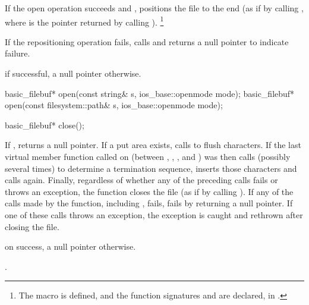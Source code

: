 \begin{itemdescr}
\pnum
If the open operation succeeds and
,
positions the file to the end
(as if by calling , where
 is the pointer returned by calling ).%
\footnote{The macro 
is defined, and the function signatures
%
and
%
are declared, in .}

\pnum
If the repositioning operation fails, calls
and returns a null pointer to indicate failure.

\pnum
\returns
{}
if successful, a null pointer otherwise.
\end{itemdescr}

%
\begin{itemdecl}
basic_filebuf* open(const string& s, ios_base::openmode mode);
basic_filebuf* open(const filesystem::path& s, ios_base::openmode mode);
\end{itemdecl}

\begin{itemdescr}
\pnum
\returns
{}
\end{itemdescr}

%
\begin{itemdecl}
basic_filebuf* close();
\end{itemdecl}

\begin{itemdescr}
\pnum
\effects
If
,
returns a null pointer.
If a put area exists, calls
to flush characters.
If the last virtual member function called on
(between
,
,
,
and
)
was
then calls
(possibly several times) to determine a termination sequence, inserts those
characters and calls
again.
Finally, regardless of whether any of the preceding calls fails or throws an
exception, the function closes the file
(as if by calling
%
).
If any of the calls made by the function, including , fails,
 fails by returning a null pointer. If one of these calls throws an
exception, the exception is caught and rethrown after closing the file.

\pnum
\returns
{}
on success, a null pointer otherwise.

\pnum
\ensures
{}.
\end{itemdescr}

